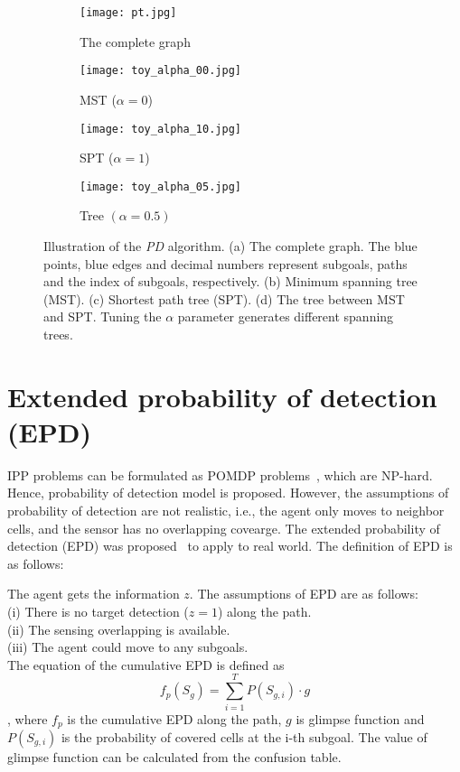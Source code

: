 \begin{figure}[htbp]
 \begin{center}
\begin{subfigure}{.22\textwidth}
  \centering
  \texttt{[image: pt.jpg]}
  \caption{The complete graph}
\end{subfigure}
\begin{subfigure}{.22\textwidth}
  \centering
  \texttt{[image: toy\_alpha\_00.jpg]}
  \caption{MST ($\alpha=0$)}
\end{subfigure}
\begin{subfigure}{.22\textwidth}
  \centering
  \texttt{[image: toy\_alpha\_10.jpg]}
  \caption{SPT ($\alpha=1$)}
\end{subfigure}
\begin{subfigure}{.22\textwidth}
  \centering
  \texttt{[image: toy\_alpha\_05.jpg]}
  \caption{Tree $(\alpha=0.5)$}
\end{subfigure}
\caption{Illustration of the \emph{PD} algorithm. (a) The complete graph.
The blue points, blue edges and decimal numbers represent subgoals, paths and the index of subgoals, respectively.
(b) Minimum spanning tree (MST).
(c) Shortest path tree (SPT).
(d) The tree between MST and SPT. Tuning the $\alpha$ parameter generates different spanning trees.
}
\label{fig:PD_intro}
 \end{center}
 \end{figure}

\section{Extended probability of detection (EPD)}


IPP problems can be formulated as POMDP problems~\cite{kadane1977optimal}, which are NP-hard. Hence, probability of detection model is proposed.
However, the assumptions of probability of detection are not realistic, i.e., the agent only moves to neighbor cells, and the sensor has no overlapping covearge. The extended probability of detection (EPD) was proposed~\cite{tseng2016learning} to apply to real world.
The definition of EPD is as follows:

\begin{definition}
The agent gets the information $z$.
The assumptions of EPD are as follows:\\
(i) There is no target detection ($z = 1$) along the path.\\
(ii) The sensing overlapping is available.\\
(iii) The agent could move to any subgoals.\\
The equation of the cumulative EPD is defined as
\begin{equation}\label{eq:cepd}
  f_p(S_g) = \sum_{i=1}^{T}P(S_{g,i})\cdot g
\end{equation}
, where $f_p$ is the cumulative EPD along the path, $g$ is glimpse function and $P(S_{g,i})$ is the probability of covered cells at the i-th subgoal. The value of glimpse function can be calculated from the confusion table.

\end{definition}


